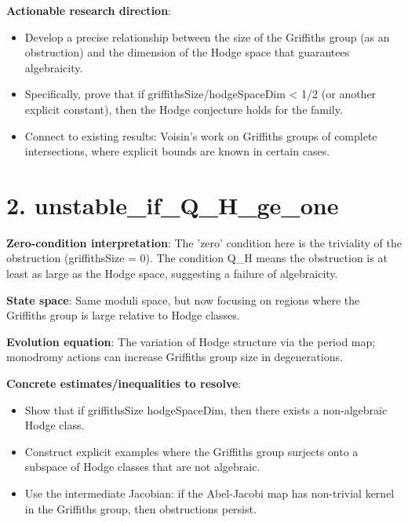 \documentclass[11pt]{article}
\begin{document}
\textbf{Actionable research direction}:
\begin{itemize}
\item Develop a precise relationship between the size of the Griffiths group (as an obstruction) and the dimension of the Hodge space that guarantees algebraicity.
\item Specifically, prove that if griffithsSize/hodgeSpaceDim < 1/2 (or another explicit constant), then the Hodge conjecture holds for the family.
\item Connect to existing results: Voisin's work on Griffiths groups of complete intersections, where explicit bounds are known in certain cases.
\end{itemize}

\section{2. unstable\_if\_Q\_H\_ge\_one}

\textbf{Zero-condition interpretation}: The 'zero' condition here is the triviality of the obstruction (griffithsSize = 0). The condition Q\_H  means the obstruction is at least as large as the Hodge space, suggesting a failure of algebraicity.

\textbf{State space}: Same moduli space, but now focusing on regions where the Griffiths group is large relative to Hodge classes.

\textbf{Evolution equation}: The variation of Hodge structure via the period map; monodromy actions can increase Griffiths group size in degenerations.

\textbf{Concrete estimates/inequalities to resolve}:
\begin{itemize}
\item Show that if griffithsSize \geq hodgeSpaceDim, then there exists a non-algebraic Hodge class.
\item Construct explicit examples where the Griffiths group surjects onto a subspace of Hodge classes that are not algebraic.
\item Use the intermediate Jacobian: if the Abel-Jacobi map has non-trivial kernel in the Griffiths group, then obstructions persist.
\end{itemize}
\end{document}
